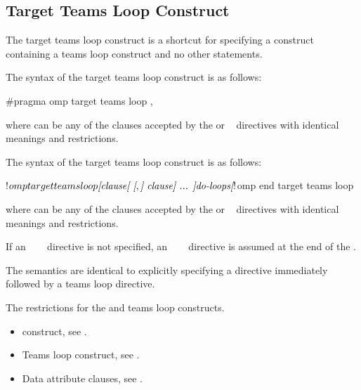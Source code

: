 \subsection{Target Teams Loop Construct}
\label{subsec:Target Teams Loop construct}
\summary
The target teams loop construct is a shortcut for specifying a 
construct containing a teams loop construct and no other statements.

\syntax
\begin{ccppspecific}
The syntax of the target teams loop construct is as follows:

\begin{ompcPragma}[fontsize=\small]
#pragma omp target teams loop \plc{[clause[ [},\plc{] clause] ... ] new-line}
\end{ompcPragma}

where  can be any of the clauses accepted by the  or
~ directives with identical
meanings and restrictions.
\end{ccppspecific}

\begin{fortranspecific}
The syntax of the target teams loop construct is as follows:

\begin{ompfPragma}
!$omp target teams loop \plc{[clause[ [},\plc{] clause] ... ]}
    \plc{do-loops}
\plc{[}!$omp end target teams loop\plc{]}
\end{ompfPragma}

where  can be any of the clauses accepted by the  or
~ directives with identical meanings and restrictions.

If an ~~~ directive is not specified, an
~~~
directive is assumed at the end of the .
\end{fortranspecific}

\descr
The semantics are identical to explicitly specifying a 
directive immediately followed by a teams loop directive.


\restrictions
The restrictions for the  and teams loop constructs.


\crossreferences
\begin{itemize}
\item {} construct, see .

\item Teams loop construct, see .

\item Data attribute clauses, see .
\end{itemize}










